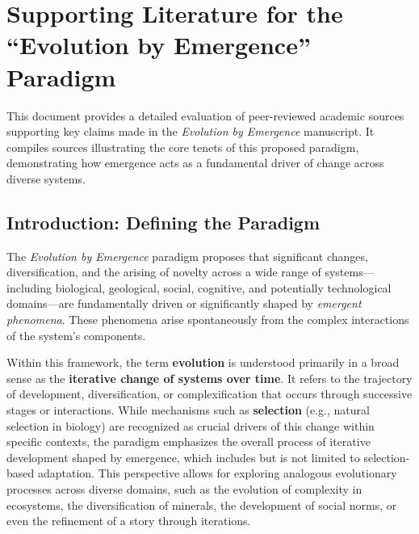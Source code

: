 \chapter{Supporting Literature for the ``Evolution by Emergence'' Paradigm}

This document provides a detailed evaluation of peer-reviewed academic sources supporting key claims made in the \emph{Evolution by Emergence} manuscript. It compiles sources illustrating the core tenets of this proposed paradigm, demonstrating how emergence acts as a fundamental driver of change across diverse systems.

\section{Introduction: Defining the Paradigm} \label{sec:introduction}

The \emph{Evolution by Emergence} paradigm proposes that significant changes, diversification, and the arising of novelty across a wide range of systems—including biological, geological, social, cognitive, and potentially technological domains—are fundamentally driven or significantly shaped by \emph{emergent phenomena}. These phenomena arise spontaneously from the complex interactions of the system's components.

Within this framework, the term \textbf{evolution} is understood primarily in a broad sense as the \textbf{iterative change of systems over time}. It refers to the trajectory of development, diversification, or complexification that occurs through successive stages or interactions. While mechanisms such as \textbf{selection} (e.g., natural selection in biology) are recognized as crucial drivers of this change within specific contexts, the paradigm emphasizes the overall process of iterative development shaped by emergence, which includes but is not limited to selection-based adaptation. This perspective allows for exploring analogous evolutionary processes across diverse domains, such as the evolution of complexity in ecosystems, the diversification of minerals, the development of social norms, or even the refinement of a story through iterations.

